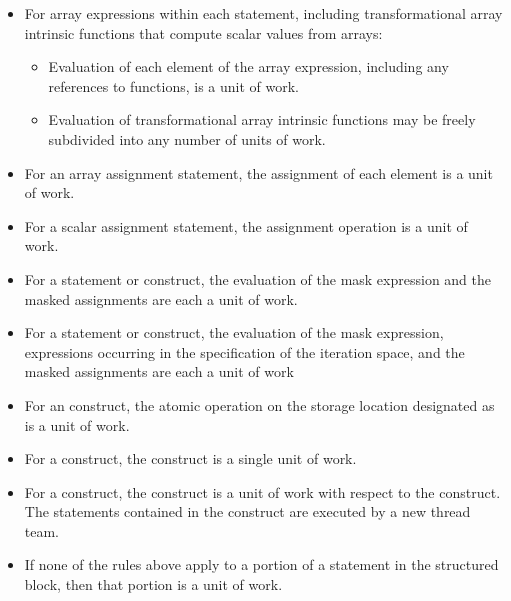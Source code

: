\begin{itemize}
\item For array expressions within each statement, including transformational array 
intrinsic functions that compute scalar values from arrays:

\begin{itemize} %
\item Evaluation of each element of the array expression, including any references to 
 functions, is a unit of work.

\item Evaluation of transformational array intrinsic functions may be freely subdivided 
into any number of units of work.
\end{itemize}

\item For an array assignment statement, the assignment of each element is a unit of work.

\item For a scalar assignment statement, the assignment operation is a unit of work.

\item For a  statement or construct, the evaluation of the mask expression and the 
masked assignments are each a unit of work.

\item For a  statement or construct, the evaluation of the mask expression, 
expressions occurring in the specification of the iteration space, and the masked 
assignments are each a unit of work

\item For an  construct, the atomic operation on the storage location designated as 
 is a unit of work.

\item For a  construct, the construct is a single unit of work.

\item For a  construct, the construct is a unit of work with respect to the 
 construct. The statements contained in the  construct are 
executed by a new thread team.

\item If none of the rules above apply to a portion of a statement in the structured block, 
then that portion is a unit of work.
\end{itemize}

